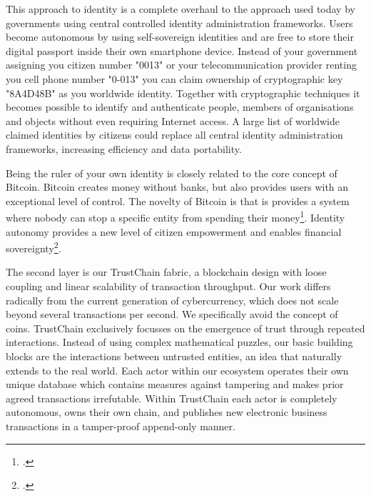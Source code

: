\documentclass[USenglish]{article}
\begin{document}
This approach to identity is a complete overhaul to the approach used today by governments using central controlled identity administration frameworks.
Users become autonomous by using self-sovereign identities and are free to store their digital passport inside their own smartphone device.
Instead of your government assigning you citizen number "0013" or your telecommunication provider renting you cell phone number "0-013" you can claim ownership of cryptographic key "8A4D48B" as you worldwide identity.
Together with cryptographic techniques it becomes possible to identify and authenticate people, members of organisations and objects without even requiring Internet access.
A large list of worldwide claimed identities by citizens could replace all central identity administration frameworks, increasing efficiency and data portability.

Being the ruler of your own identity is closely related to the core concept of Bitcoin.
Bitcoin creates money without banks, but also provides users with an exceptional level of control.
The novelty of Bitcoin is that is provides a system where nobody can stop a specific entity from spending their money\footcite{r3corda}.
Identity autonomy provides a new level of citizen empowerment and enables financial sovereignty\footcite{matouk2009financial}.

The second layer is our TrustChain fabric, a blockchain design with loose coupling and linear scalability of transaction throughput. 
Our work differs radically from the current generation of cybercurrency, which does not scale beyond several transactions per second. 
We specifically avoid the concept of coins.
TrustChain exclusively focusses on the emergence of trust through repeated interactions.
Instead of using complex mathematical puzzles, our basic building blocks are the interactions between untrusted entities, an idea that naturally extends to the real world.
Each actor within our ecosystem operates their own unique database which contains measures against tampering and makes prior agreed transactions irrefutable.
Within TrustChain each actor is completely autonomous, owns their own chain, and publishes new electronic business transactions in a tamper-proof append-only manner.
\end{document}

